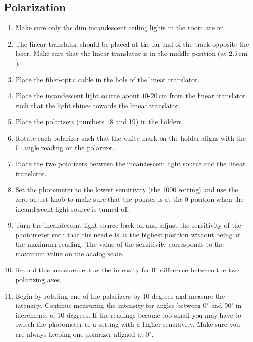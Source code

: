 \subsection{Polarization}
\begin{enumerate}
\item Make sure only the dim incandescent ceiling lights in the room are on.

\item The linear translator should be placed at the far end of the track opposite the laser. Make sure that the linear translator is in the middle position (at $2.5\,\mathrm{cm}$).

\item Place the fiber-optic cable in the hole of the linear translator.

\item Place the incandescent light source about $10$-$20\,\mathrm{cm}$ from the linear translator such that the light shines towards the linear translator.

\item Place the polarizers (numbers 18 and 19) in the holders.

\item Rotate each polarizer such that the white mark on the holder aligns with the $0^{\circ}$ angle reading on the polarizer.

\item Place the two polarizers between the incandescent light source and the linear translator.

\item Set the photometer to the lowest sensitivity (the 1000 setting) and use the zero adjust knob to make sure that the pointer is at the 0 position when the incandescent light source is turned off.

\item Turn the incandescent light source back on and adjust the sensitivity of the photometer such that the needle is at the highest position without being at the maximum reading. The value of the sensitivity corresponds to the maximum value on the analog scale.

\item Record this measurement as the intensity for $0^{\circ}$ difference between the two polarizing axes.

\item Begin by rotating one of the polarizers by 10 degrees and measure the intensity. Continue measuring the intensity for angles between $0^{\circ}$ and $90^{\circ}$ in increments of 10 degrees. If the readings become too small you may have to switch the photometer to a setting with a higher sensitivity. Make sure you are always keeping one polarizer aligned at $0^{\circ}$.


\end{enumerate}
